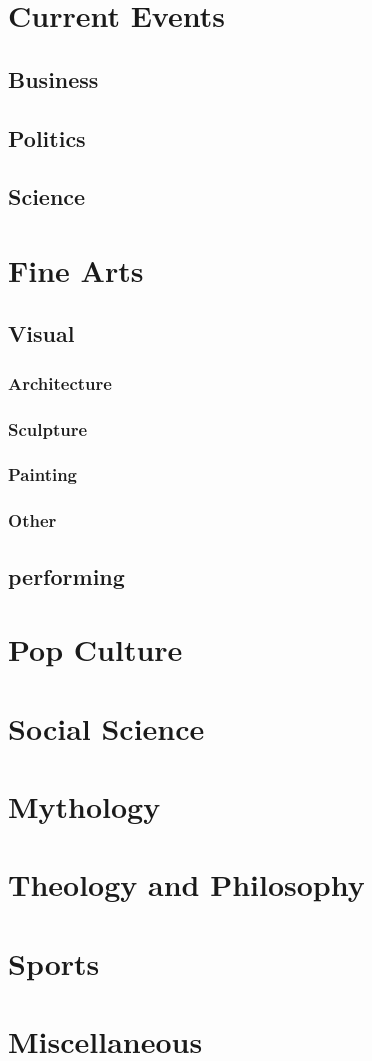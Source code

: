 \documentclass{book}
\begin{document}
	
\chapter{Current Events}
		\section{Business}
		\section{Politics}
		\section{Science}
	
\chapter{Fine Arts}
	\section{Visual}
		\subsection{Architecture}
		\subsection{Sculpture}
		\subsection{Painting}
		\subsection{Other}
		
	\section{performing}
	
\chapter{Pop Culture}
\chapter{Social Science}
\chapter{Mythology}
\chapter{Theology and Philosophy}
\chapter{Sports}
\chapter{Miscellaneous}
\end{document}
